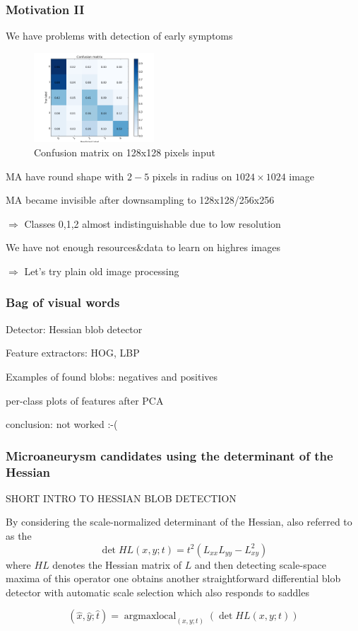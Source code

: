 \documentclass{beamer}
\begin{document}
\begin{frame}\frametitle{Motivation II}
\par We have problems with detection of early symptoms
\par
\begin{figure}
\begin{center}
\vspace{-10pt}
\includegraphics[width=0.4\textwidth]{pics/submission_21_inner_squares_conv5_maxout.png}
\caption{Confusion matrix on 128x128 pixels input}
\vspace{-15pt}
\end{center}
\end{figure}

\par MA have round shape with $2-5$ pixels in radius on $1024\times1024$ image 
\par MA became invisible after downsampling to 128x128/256x256
\par $\Rightarrow$ Classes 0,1,2 almost indistinguishable due to low resolution
\vspace{0.5cm}
\par We have not enough resources\&data to learn on highres images
\par $\Rightarrow$ Let's try plain old image processing

\end{frame}

\begin{frame}\frametitle{Bag of visual words}
\par Detector: Hessian blob detector
\par Feature extractors: HOG, LBP
\par Examples of found blobs: negatives and positives
\par per-class plots of features after PCA
\par conclusion: not worked :-(
\end{frame}

\begin{frame}\frametitle{Microaneurysm candidates using the determinant of the Hessian}
\par SHORT INTRO TO HESSIAN BLOB DETECTION

\par By considering the scale-normalized determinant of the Hessian, also referred to as the 
\[ \operatorname{det} HL(x, y; t) = t^2 (L_{xx} L_{yy} - L_{xy}^2) \]
where $HL$ denotes the Hessian matrix of $L$ and then detecting scale-space maxima of this operator one obtains another straightforward differential blob detector with automatic scale selection which also responds to saddles

\[(\hat{x}, \hat{y}; \hat{t}) = \operatorname{argmaxlocal}_{(x, y; t)}(\operatorname{det} H L(x, y; t))\]
\end{frame}
\end{document}
